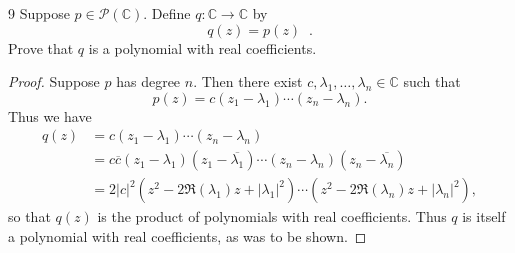 \documentclass[11pt]{extarticle}
\newenvironment{problem}[1]{\begin{prob*}{#1}{}}{\end{prob*}}
\newcommand{\C}{\mathbb{C}}
\newcommand{\poly}{\mathcal{P}}
\newcommand\widebar[1]{\mathop{\overline{#1}}}
\begin{document}
\begin{problem}{9}
Suppose $p\in\poly(\C)$.  Define $q:\C\to\C$ by
\begin{equation*}
q(z) = p(z)\widebar{p(\overline{z})}.
\end{equation*}
Prove that $q$ is a polynomial with real coefficients.
\end{problem}
\begin{proof}
Suppose $p$ has degree $n$.  Then there exist $c,\lambda_1,\dots,\lambda_n\in\C$ such that 
\begin{equation*}
p(z) = c(z_1 - \lambda_1)\cdots(z_n-\lambda_n).
\end{equation*}
Thus we have
\begin{align*}
q(z) &= c(z_1 - \lambda_1)\cdots(z_n-\lambda_n)\widebar{c\left(\overline{z_1} - \lambda_1\right)\cdots\left(\overline{z_n}-\lambda_n\right)}\\
&= c\overline{c}(z_1 - \lambda_1)\left(z_1 - \overline{\lambda_1}\right)\cdots(z_n-\lambda_n)\left(z_n - \overline{\lambda_n}\right)\\
&= 2|c|^2\left(z^2 -2\Re(\lambda_1)z + |\lambda_1|^2\right)\cdots\left(z^2 -2\Re(\lambda_n)z + |\lambda_n|^2\right),
\end{align*}
so that $q(z)$ is the product of polynomials with real coefficients.  Thus $q$ is itself a polynomial with real coefficients, as was to be shown.
\end{proof}
\end{document}

